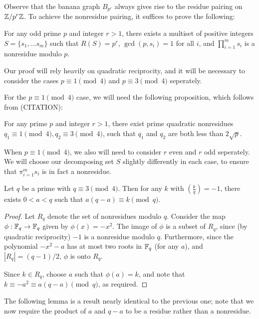\documentclass{amsart}
\begin{document}
Observe that the banana graph $B_{p^r}$ always gives rise to the
residue pairing on $\mathbb{Z}/p^r\mathbb{Z}$. To achieve the nonresidue pairing, it
suffices to prove the following:

\begin{prop}
  \label{prop:exist_decomp}
  For any odd prime $p$ and integer $r > 1$, there exists a
  multiset of positive integers $S = \{s_1, \ldots s_m\}$ such that
  $R(S) = p^r$, $\gcd(p, s_i) = 1$ for all $i$, and $\prod_{i=1}^ms_i$
  is a nonresidue modulo $p$.
\end{prop}

Our proof will rely heavily on quadratic reciprocity, and it will be
necessary to consider the cases $p \equiv 1 \pmod 4$ and $p \equiv 3
\pmod 4$ seperately.

For the $p \equiv 1 \pmod 4$ case, we will need the following
proposition, which follows from (CITATION):
\begin{prop}
  \label{prop:q_bound}
  For any prime $p$ and integer $r > 1$, there exist prime quadratic
  nonresidues $q_1 \equiv 1 \pmod 4, q_2 \equiv 3 \pmod 4$, such that
  $q_1$ and $q_2$ are both less than $2\sqrt{p}$.
\end{prop}

When $p \equiv 1 \pmod 4$, we also will need to consider $r$ even and
$r$ odd seperately. We will choose our decomposing set $S$ slightly
differently in each case, to ensure that $\pi_{i=1}^ms_i$ is in fact a
nonresidue.

\begin{lem}
  \label{lem:decompose_q_non}
  Let $q$ be a prime with $q \equiv 3 \pmod 4$. Then for any $k$
  with $\left( \frac{k}{q} \right) = -1$, there exists $0 < a < q$
  such that $a(q-a) \equiv k \pmod q$. 
\end{lem}
\begin{proof}
  Let $R_q$ denote the set of nonresidues modulo $q$. Consider the map
  $\phi:\mathbb{F}_q \to \mathbb{F}_q$ given by $\phi(x) = -x^2$. The image of $\phi$
  is a subset of $R_q$, since (by quadratic reciprocity) $-1$ is a
  nonresidue modulo $q$. Furthermore, since the polynomial $-x^2 - a$
  has at most two roots in $\mathbb{F}_q$ (for any $a$), and $|R_q| = (q -
  1)/2$, $\phi$ is onto $R_q$.

  Since $k \in R_q$, choose $a$ such that $\phi(a) = k$, and note
  that $k \equiv -a^2 \equiv a(q-a) \pmod q$, as required.
\end{proof}

The following lemma is a result nearly identical to the previous one;
note that we now require the product of $a$ and $q-a$ to be a residue
rather than a nonresidue.
\end{document}
